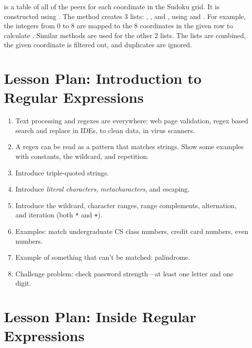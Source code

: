 \documentclass[9pt]{extbook}
\begin{document}
 is a table of all of the peers for each
coordinate in the Sudoku grid.  It is constructed using
. The  method creates 3
lists: , , and
, using  and
. For example, the integers from 0 to 8 are mapped
to the 8 coordinates in the given row to calculate
. Similar methods are used for the other 2 lists.
The lists are combined, the given coordinate is filtered out, and
duplicates are ignored.

\chapter{Lesson Plan: Introduction to Regular Expressions}

\begin{enumerate}

  \item Text processing and regexes are everywhere: web page validation, regex
  based search and replace in IDEs, to clean data, in virus scanners.

  \item A regex can be read as a pattern that matches strings. Show some
  examples with constants, the wildcard, and repetition.

  \item Introduce triple-quoted strings.

  \item Introduce \emph{literal characters}, \emph{metacharacters}, and
  escaping.

  \item Introduce the wildcard, character ranges, range complements, alternation,
  and iteration (both \texttt{*} and \texttt{+}).

  \item Examples: match undergraduate CS class numbers, credit card numbers,
  even numbers.

  \item Example of something that can't be matched: palindrome.

  \item Challenge problem: check password strength---at least one letter
  and one digit.

\end{enumerate}

\chapter{Lesson Plan: Inside Regular Expressions}
\end{document}

